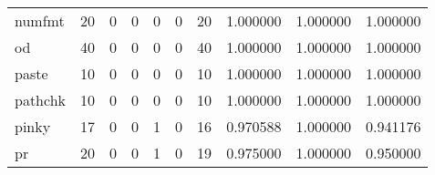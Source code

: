 \begin{tabular}{lrrrrrrrrr}
numfmt    &                                      20 &                                                  0 &                                                  0 &                                                  0 &                                                  0 &                                                 20 &                                           1.000000 &                               1.000000 &                             1.000000 \\
od        &                                      40 &                                                  0 &                                                  0 &                                                  0 &                                                  0 &                                                 40 &                                           1.000000 &                               1.000000 &                             1.000000 \\
paste     &                                      10 &                                                  0 &                                                  0 &                                                  0 &                                                  0 &                                                 10 &                                           1.000000 &                               1.000000 &                             1.000000 \\
pathchk   &                                      10 &                                                  0 &                                                  0 &                                                  0 &                                                  0 &                                                 10 &                                           1.000000 &                               1.000000 &                             1.000000 \\
pinky     &                                      17 &                                                  0 &                                                  0 &                                                  1 &                                                  0 &                                                 16 &                                           0.970588 &                               1.000000 &                             0.941176 \\
pr        &                                      20 &                                                  0 &                                                  0 &                                                  1 &                                                  0 &                                                 19 &                                           0.975000 &                               1.000000 &                             0.950000 \\

\end{tabular}
